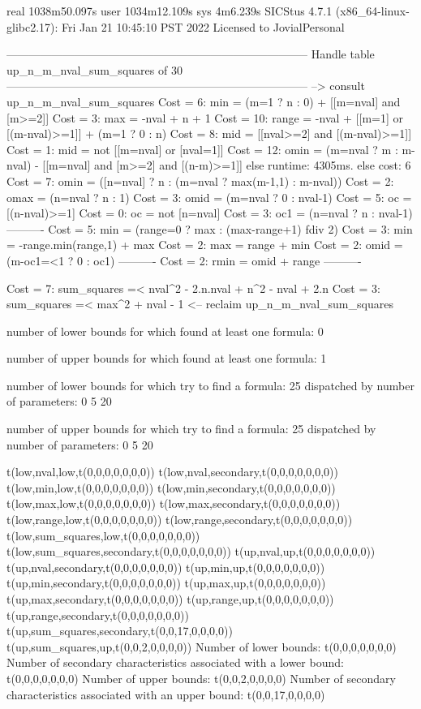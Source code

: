 real	1038m50.097s
user	1034m12.109s
sys	4m6.239s
SICStus 4.7.1 (x86_64-linux-glibc2.17): Fri Jan 21 10:45:10 PST 2022
Licensed to JovialPersonal


--------------------------------------------------------------------------------
Handle table up_n_m_nval_sum_squares of 30
--------------------------------------------------------------------------------
--> consult up_n_m_nval_sum_squares
Cost =  6:  min   = (m=1 ? n : 0) + [[m=nval] and [m>=2]] %
Cost =  3:  max   = -nval + n + 1
Cost = 10:  range = -nval + [[m=1] or [(m-nval)>=1]] + (m=1 ? 0 : n) %
Cost =  8:  mid   = [[nval>=2] and [(m-nval)>=1]]
Cost =  1:  mid   = not [[m=nval] or [nval=1]]
Cost = 12:  omin  = (m=nval ? m : m-nval) - [[m=nval] and [m>=2] and [(n-m)>=1]] %
else runtime: 4305ms. else cost: 6
Cost =  7:  omin  = ([n=nval] ? n : (m=nval ? max(m-1,1) : m-nval)) %
Cost =  2:  omax  = (n=nval ? n : 1)
Cost =  3:  omid  = (m=nval ? 0 : nval-1)
Cost =  5:  oc    = [(n-nval)>=1]
Cost =  0:  oc    = not [n=nval]
Cost =  3:  oc1   = (n=nval ? n : nval-1)
----------
Cost =  5:  min   = (range=0 ? max : (max-range+1) fdiv 2)
Cost =  3:  min   = -range.min(range,1) + max
Cost =  2:  max   = range + min
Cost =  2:  omid  = (m-oc1=<1 ? 0 : oc1)
----------
Cost =  2:  rmin  = omid + range
----------

Cost =  7:  sum_squares =< nval^2 - 2.n.nval + n^2 - nval + 2.n
Cost =  3:  sum_squares =< max^2 + nval - 1
<-- reclaim up_n_m_nval_sum_squares

number of lower bounds for which found at least one formula: 0

number of upper bounds for which found at least one formula: 1

number of lower bounds for which try to find a formula: 25
dispatched by number of parameters: 0  5  20

number of upper bounds for which try to find a formula: 25
dispatched by number of parameters: 0  5  20

t(low,nval,low,t(0,0,0,0,0,0,0))
t(low,nval,secondary,t(0,0,0,0,0,0,0))
t(low,min,low,t(0,0,0,0,0,0,0))
t(low,min,secondary,t(0,0,0,0,0,0,0))
t(low,max,low,t(0,0,0,0,0,0,0))
t(low,max,secondary,t(0,0,0,0,0,0,0))
t(low,range,low,t(0,0,0,0,0,0,0))
t(low,range,secondary,t(0,0,0,0,0,0,0))
t(low,sum_squares,low,t(0,0,0,0,0,0,0))
t(low,sum_squares,secondary,t(0,0,0,0,0,0,0))
t(up,nval,up,t(0,0,0,0,0,0,0))
t(up,nval,secondary,t(0,0,0,0,0,0,0))
t(up,min,up,t(0,0,0,0,0,0,0))
t(up,min,secondary,t(0,0,0,0,0,0,0))
t(up,max,up,t(0,0,0,0,0,0,0))
t(up,max,secondary,t(0,0,0,0,0,0,0))
t(up,range,up,t(0,0,0,0,0,0,0))
t(up,range,secondary,t(0,0,0,0,0,0,0))
t(up,sum_squares,secondary,t(0,0,17,0,0,0,0))
t(up,sum_squares,up,t(0,0,2,0,0,0,0))
Number of lower bounds:                                             t(0,0,0,0,0,0,0)
Number of secondary characteristics associated with a lower bound:  t(0,0,0,0,0,0,0)
Number of upper bounds:                                             t(0,0,2,0,0,0,0)
Number of secondary characteristics associated with an upper bound: t(0,0,17,0,0,0,0)

